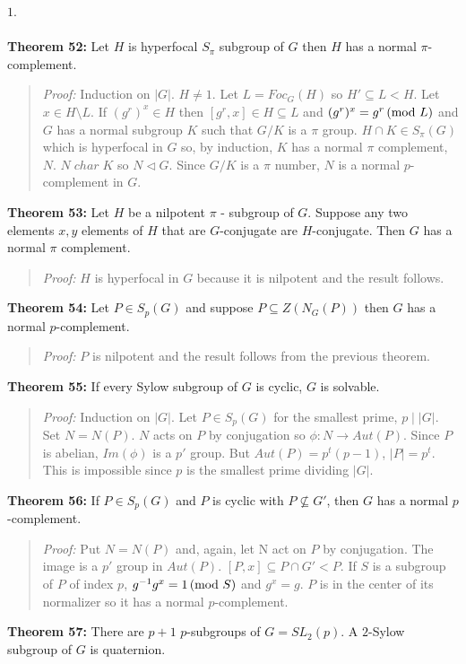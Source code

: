 $1$.
\\
\\
{\bf Theorem 52:} Let $H$ is hyperfocal $S_{\pi}$ subgroup of $G$ then $H$ has a normal $\pi$-complement.
\begin{quote}
\emph{Proof:}
Induction on $|G|$.  $H \neq 1$.  Let $L = Foc_G(H)$ so $H' \subseteq L < H$.  Let $x \in H \setminus L$.  If
$(g^r)^x \in H$ then $[g^r, x] \in H \subseteq L$ and $(g^r)^x = g^r \thinspace \textnormal{(mod } L \textnormal{)}$ and $G$ has a normal subgroup $K$
such that $G/K$ is a $\pi$ group.  $H \cap K \in S_{\pi}(G)$ which is hyperfocal in $G$ so, by induction, $K$ has
a normal $\pi$ complement, $N$.  $N \;  char  \; K$ so $N \lhd G$.  Since $G/K$ is a $\pi$ number, $N$ is a normal $p$-complement
in $G$.
\end{quote}
{\bf Theorem 53:} Let $H$ be a nilpotent $\pi$ - subgroup of $G$.  Suppose any two elements $x, y$ elements of
$H$ that are $G$-conjugate are $H$-conjugate.  Then $G$ has a normal $\pi$ complement.
\begin{quote}
\emph{Proof:}
$H$ is hyperfocal in $G$ because it is nilpotent and the result follows.
\end{quote}
{\bf Theorem 54:} Let $P \in S_p(G)$ and suppose $P \subseteq Z(N_G(P))$ then $G$ has a normal $p$-complement.
\begin{quote}
\emph{Proof:}
$P$ is nilpotent and the result follows from the previous theorem.
\end{quote}
{\bf Theorem 55:} If every Sylow subgroup of $G$ is cyclic, $G$ is solvable.
\begin{quote}
\emph{Proof:}
Induction on $|G|$.  Let $P \in S_p(G)$ for the smallest prime, $p \mid |G|$.  Set $N= N(P)$.  $N$ acts
on $P$ by conjugation so $\phi: N \rightarrow Aut(P)$.  Since $P$ is abelian, $Im( \phi )$ is a $p'$ group.
But $Aut(P)= p^t (p-1)$, $|P|= p^t$.  This is impossible since $p$ is the smallest prime dividing $|G|$.
\end{quote}
{\bf Theorem 56:} If $P \in S_p(G)$ and $P$ is cyclic with $P \nsubseteq G'$, then $G$ has a normal $p$-complement.
\begin{quote}
\emph{Proof:}
Put $N = N(P)$ and, again, let N act on $P$ by conjugation.  The image is a $p'$ group in $Aut(P)$.
$[P, x] \subseteq P \cap G' <P$.  If $S$ is a subgroup of $P$ of index $p$, $g^{-1} g^x = 1 \thinspace \textnormal{(mod } S \textnormal{)}$
and $g^x=g$.  $P$ is in the center of its normalizer so it has a normal $p$-complement.
\end{quote}
{\bf Theorem 57:} There are $p+1$ $p$-subgroups of $G = SL_2(p)$.  A $2$-Sylow subgroup of $G$ is quaternion.
